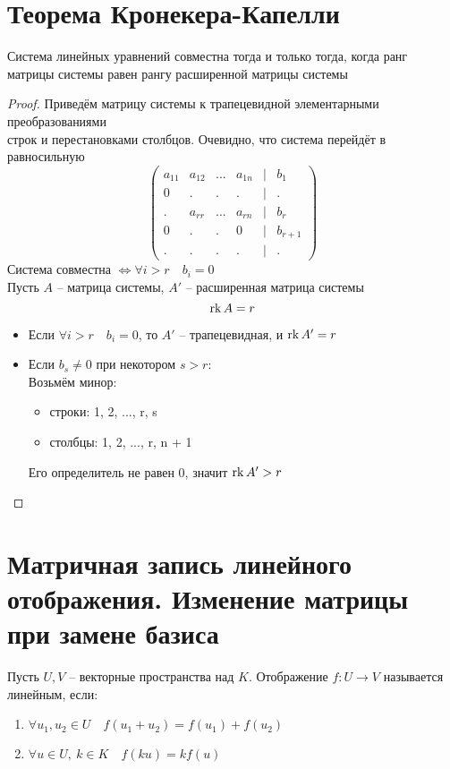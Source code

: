 \section{Теорема Кронекера-Капелли}

\begin{theorem}
	Система линейных уравнений совместна тогда и только тогда, когда ранг матрицы системы равен рангу расширенной матрицы системы
\end{theorem}

\begin{proof}
	Приведём матрицу системы к трапецевидной элементарными преобразованиями \\ строк и перестановками столбцов. Очевидно, что система перейдёт в равносильную
	$$
	\begin{pmatrix}
		a_{11} & a_{12} & ... & a_{1n} & | & b_1 \\
		0 & . & . & . & | & . \\
		. & a_{rr} & ... & a_{rn} & | & b_r \\
		0 & . & . & 0 & | & b_{r + 1} \\
		. & . & . & . & | & .
	\end{pmatrix} $$
	Система совместна $ \iff \forall i > r \quad b_i = 0 $ \\
	Пусть $ A $ -- матрица системы, $ A' $ -- расширенная матрица системы
	$$ \operatorname{rk} A = r $$
	\begin{itemize}
		\item Если $ \forall i > r \quad b_i = 0 $, то $ A' $ -- трапецевидная, и $ \operatorname{rk} A' = r $
		\item Если $ b_s \ne 0 $ при некотором $ s > r $: \\
		Возьмём минор:
		\begin{itemize}
			\item строки: 1, 2, ..., r, s
			\item столбцы: 1, 2, ..., r, n + 1
		\end{itemize}
		Его определитель не равен 0, значит $ \operatorname{rk} A' > r $
	\end{itemize}
\end{proof}

\section{Матричная запись линейного отображения. Изменение матрицы при замене базиса}

\begin{definition}
	Пусть $ U, V $ -- векторные пространства над $ K $. Отображение $ f : U \to V $ называется линейным, если:
	\begin{enumerate}
		\item $ \forall u_1, u_2 \in U \quad f(u_1 + u_2) = f(u_1) + f(u_2) $
		\item $ \forall u \in U, ~ k \in K \quad f(ku) = kf(u) $
	\end{enumerate}
\end{definition}

